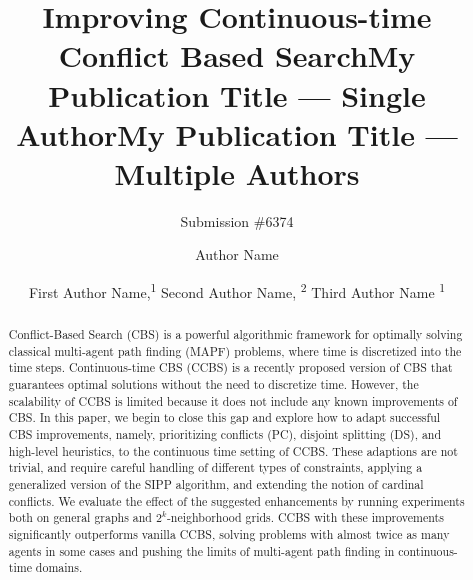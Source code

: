\documentclass[letterpaper]{article} %
\title{Improving Continuous-time Conflict Based Search}
\author{
Submission \#6374
}
\title{My Publication Title --- Single Author}
\author {
    Author Name \\
}
\title{My Publication Title --- Multiple Authors}
\author {

        First Author Name,\textsuperscript{\rm 1}
        Second Author Name, \textsuperscript{\rm 2}
        Third Author Name \textsuperscript{\rm 1} \\
}
\newcommand\roni[1]{\nb{\textbf{Roni:}}{orange}{#1}}
\begin{document}
\maketitle

\linenumbers  %

\begin{abstract}
Conflict-Based Search (CBS) is a powerful algorithmic framework for optimally solving classical multi-agent path finding (MAPF) problems, where time is discretized into the time steps. 
Continuous-time CBS (CCBS) is a recently proposed version of CBS that guarantees optimal solutions without the need to discretize time. 
However, the  scalability of CCBS is limited because it does not include any known improvements of CBS. 
In this paper, we begin to close this gap and explore how to adapt successful CBS improvements, namely, prioritizing conflicts (PC), disjoint splitting (DS), and high-level heuristics, to the continuous time setting of CCBS. 
These adaptions are not trivial, and require careful handling of different types of constraints, applying a generalized version of the \acf{SIPP} algorithm, and extending the notion of cardinal conflicts.  
We evaluate the effect of the suggested enhancements by running experiments both on general graphs and $2^k$-neighborhood grids. 
CCBS with these improvements significantly outperforms vanilla CCBS, 
solving problems with almost twice as many agents in some cases and 
pushing the limits of multi-agent path finding in continuous-time domains. 




\end{abstract}
\end{document}
